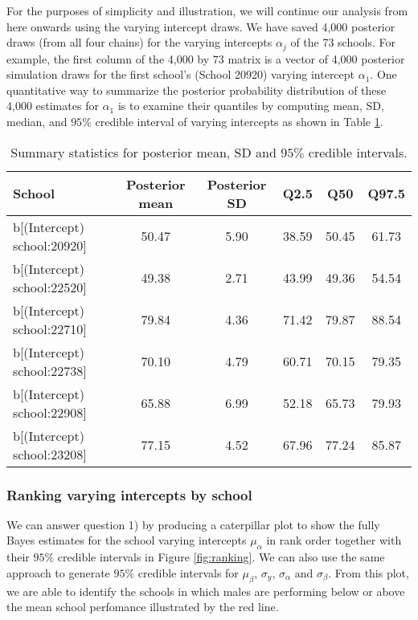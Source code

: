 For the purposes of simplicity and illustration, we will continue our analysis from here onwards using the varying intercept draws. We have saved 4,000 posterior draws (from all four chains) for the varying intercepts $\alpha_{j}$ of the 73 schools. For example, the first column of the 4,000 by 73 matrix is a vector of 4,000 posterior simulation draws for the first school's (School 20920) varying intercept $\alpha_{1}$.  One quantitative way to summarize the posterior probability distribution of these 4,000 estimates for $\alpha_{1}$ is to examine their quantiles by computing mean, SD, median, and $95\%$ credible interval of varying intercepts as shown in Table \ref{tab:summary_data}.

\begin{table}[ht]
	\centering
	\def\arraystretch{1.3}
	{\small
		\begin{tabular}{l | c c c c c}
			School & Posterior mean & Posterior SD & Q2.5 & Q50 & Q97.5\\
			\hline
			b[(Intercept) school:20920] & 50.47 & 5.90 & 38.59 & 50.45 & 61.73 \\
			b[(Intercept) school:22520] & 49.38 & 2.71 & 43.99 & 49.36 & 54.54 \\
			b[(Intercept) school:22710] & 79.84 & 4.36 &  71.42 & 79.87 & 88.54 \\
			b[(Intercept) school:22738] & 70.10 & 4.79 & 60.71 & 70.15 & 79.35  \\
			b[(Intercept) school:22908] & 65.88 & 6.99 & 52.18 & 65.73 & 79.93 \\
			b[(Intercept) school:23208] &  77.15 & 4.52 & 67.96 & 77.24 & 85.87
		\end{tabular}
	}
	\caption{{\small Summary statistics for posterior mean, SD and $95\%$ credible intervals.}}
	\label{tab:summary_data}
\end{table}

\subsubsection{Ranking varying intercepts by school}

We can answer question 1) by producing a caterpillar plot to show the fully Bayes estimates for the school varying intercepts $\mu_\alpha$ in rank order together with their $95\%$ credible intervals in Figure \ref{fig:ranking}. We can also use the same approach to generate $95\%$ credible intervals for $\mu_\beta$, $\sigma_y$, $\sigma_\alpha$ and $\sigma_\beta$. From this plot, we are able to identify the schools in which males are performing below or above the mean school perfomance illustrated by the red line.

